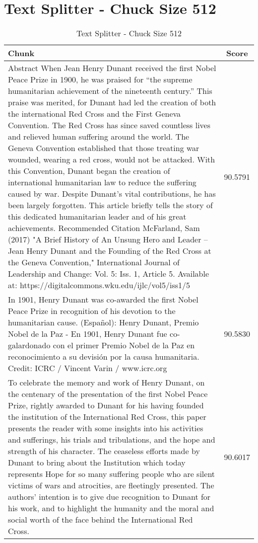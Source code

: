 \section{Text Splitter - Chuck Size 512}\label{sec:chunking:text-splitter}
\begin{table}[h!]
    \footnotesize
    \begin{xltabular}{\linewidth}{X|c}
        \toprule
        \textbf{Chunk} & \textbf{Score} \\
        \midrule
        Abstract When Jean Henry Dunant received the first Nobel Peace Prize in 1900, he was praised for “the supreme humanitarian achievement of the nineteenth century.” This praise was merited, for Dunant had led the creation of both the international Red Cross and the First Geneva Convention. The Red Cross has since saved countless lives and relieved human suffering around the world. The Geneva Convention established that those treating war wounded, wearing a red cross, would not be attacked. With this Convention, Dunant began the creation of international humanitarian law to reduce the suffering caused by war. Despite Dunant’s vital contributions, he has been largely forgotten. This article briefly tells the story of this dedicated humanitarian leader and of his great achievements. Recommended Citation McFarland, Sam (2017) "A Brief History of An Unsung Hero and Leader – Jean Henry Dunant and the Founding of the Red Cross at the Geneva Convention," International Journal of Leadership and Change: Vol. 5: Iss. 1, Article 5. Available at: https://digitalcommons.wku.edu/ijlc/vol5/iss1/5 & 90.5791\\ \hline
        In 1901, Henry Dunant was co-awarded the first Nobel Peace Prize in recognition of his devotion to the humanitarian cause. (Español): Henry Dunant, Premio Nobel de la Paz - En 1901, Henry Dunant fue co-galardonado con el primer Premio Nobel de la Paz en reconocimiento a su devisión por la causa humanitaria. Credit: ICRC / Vincent Varin / www.icrc.org & 90.5830\\ \hline
        To celebrate the memory and work of Henry Dunant, on the centenary of the presentation of the first Nobel Peace Prize, rightly awarded to Dunant for his having founded the institution of the International Red Cross, this paper presents the reader with some insights into his activities and sufferings, his trials and tribulations, and the hope and strength of his character. The ceaseless efforts made by Dunant to bring about the Institution which today represents Hope for so many suffering people who are silent victims of wars and atrocities, are fleetingly presented. The authors' intention is to give due recognition to Dunant for his work, and to highlight the humanity and the moral and social worth of the face behind the International Red Cross. & 90.6017 \\
        \bottomrule
    \end{xltabular}
    \caption{Text Splitter - Chuck Size 512}
    \label{tab:table-text-splitter}
\end{table}


